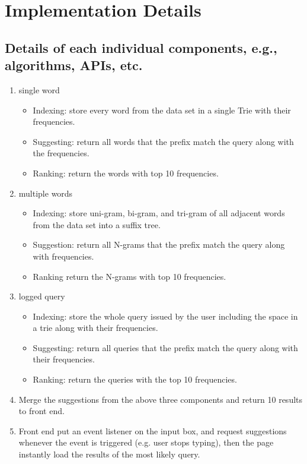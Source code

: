 \documentclass{article}
\begin{document}
\section{Implementation Details}
\subsection{Details of each individual components, e.g., algorithms, APIs, etc.}
\begin{enumerate}
  \item single word
  \begin{itemize}
  \item  Indexing: store every word from the data set in a single Trie with their frequencies.
  \item Suggesting: return all words that the prefix match the query along with the frequencies. 
  \item Ranking: return the words with top 10 frequencies.
\end{itemize}
	
	
  \item multiple words
  
  \begin{itemize} 
	\item Indexing: store uni-gram, bi-gram, and tri-gram of all adjacent words from the data set into a suffix tree.
	\item Suggestion: return all N-grams that the prefix match the query along with frequencies.
	\item Ranking return the N-grams with top 10 frequencies.
\end{itemize}
  \item logged query
  \begin{itemize} 

\item Indexing: store the whole query issued by the user including the space in a trie along with their frequencies.
\item Suggesting: return all queries that the prefix match the query along with their frequencies.
\item Ranking: return the queries with the top 10 frequencies.
\end{itemize}

\item

Merge the suggestions from the above three components and return 10 results to front end.

\item

Front end put an event listener on the input box, and request suggestions whenever the event is triggered (e.g. user stops typing), then the page instantly load the results of the most likely query.
	

\end{enumerate}
\end{document}
